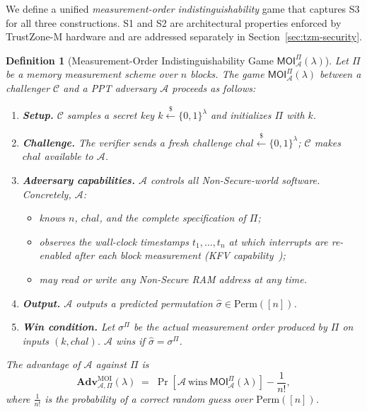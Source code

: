 \documentclass{ieeeaccess}
\newtheorem{definition}{Definition}
\newcommand{\Adv}{\mathbf{Adv}}
\begin{document}
We define a unified \emph{measurement-order indistinguishability} game that
captures S3 for all three constructions.
S1 and S2 are architectural properties enforced by TrustZone-M hardware
and are addressed separately in Section~\ref{sec:tzm-security}.
 
\begin{definition}[Measurement-Order Indistinguishability Game
  $\mathsf{MOI}^{\Pi}_{\mathcal{A}}(\lambda)$]
\label{def:moi-game}
Let $\Pi$ be a memory measurement scheme over $n$ blocks.
The game $\mathsf{MOI}^{\Pi}_{\mathcal{A}}(\lambda)$ between a challenger
$\mathcal{C}$ and a PPT adversary $\mathcal{A}$ proceeds as follows:
\begin{enumerate}
  \item \textbf{Setup.}
    $\mathcal{C}$ samples a secret key
    $k \xleftarrow{\$} \{0,1\}^{\lambda}$ and initializes $\Pi$ with $k$.
  \item \textbf{Challenge.}
    The verifier sends a fresh challenge
    $\mathit{chal} \xleftarrow{\$} \{0,1\}^{\lambda}$;
    $\mathcal{C}$ makes $\mathit{chal}$ available to $\mathcal{A}$.
  \item \textbf{Adversary capabilities.}
    $\mathcal{A}$ controls all Non-Secure-world software.
    Concretely, $\mathcal{A}$:
    \begin{itemize}
      \item knows $n$, $\mathit{chal}$, and the complete specification of $\Pi$;
      \item observes the wall-clock timestamps $t_1,\dots,t_n$ at which interrupts are re-enabled after each block measurement (KFV capability~\cite{smarm});
      \item may read or write any Non-Secure RAM address at any time.
    \end{itemize}
  \item \textbf{Output.}
    $\mathcal{A}$ outputs a predicted permutation
    $\hat{\sigma} \in \mathrm{Perm}([n])$.
  \item \textbf{Win condition.}
    Let $\sigma^{\Pi}$ be the actual measurement order produced by $\Pi$
    on inputs $(k, \mathit{chal})$.
    $\mathcal{A}$ wins if $\hat{\sigma} = \sigma^{\Pi}$.
\end{enumerate}
The advantage of $\mathcal{A}$ against $\Pi$ is
\[
  \Adv^{\mathrm{MOI}}_{\mathcal{A},\Pi}(\lambda)
  \;=\; \Pr\!\left[\mathcal{A}\ \text{wins}\ \mathsf{MOI}^{\Pi}_{\mathcal{A}}(\lambda)\right]
  - \frac{1}{n!},
\]
where $\frac{1}{n!}$ is the probability of a correct random guess over
$\mathrm{Perm}([n])$.
\end{definition}
 
\end{document}
